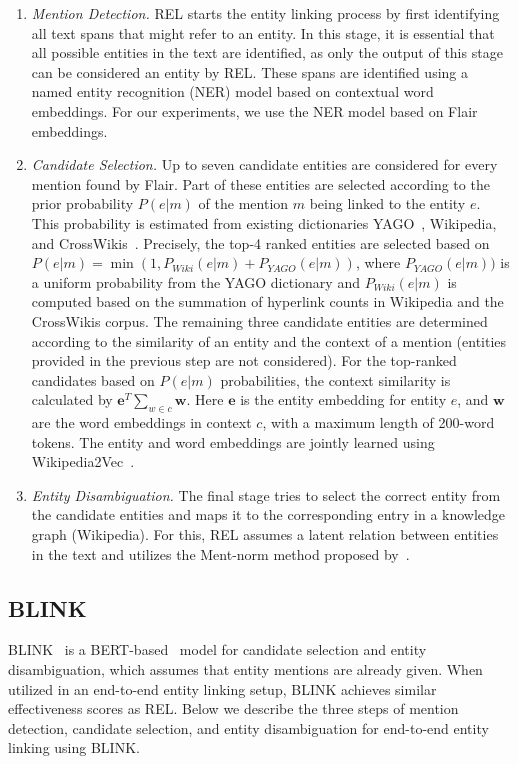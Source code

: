 \begin{enumerate}
	\item \emph{Mention Detection.} REL starts the entity linking process by first identifying all text spans that might refer to an entity. In this stage, it is essential that all possible entities in the text are identified, as only the output of this stage can be considered an entity by REL. These spans are identified using a named entity recognition (NER) model based on contextual word embeddings. For our experiments, we use the NER model based on Flair~\citep{flair} embeddings. 
	\item \emph{Candidate Selection.} Up to seven candidate entities are considered for every mention found by Flair. Part of these entities are selected according to the prior probability $P(e|m)$ of the mention $m$ being linked to the entity $e$. This probability is estimated from existing dictionaries YAGO~\citep{yago}, Wikipedia, and CrossWikis~\citep{crosswiki}. Precisely, the top-4 ranked entities are selected based on $P(e|m) = \min(1, P_{\mathit{Wiki}}(e|m) + P_{\mathit{YAGO}}(e|m))$, where $P_{\mathit{YAGO}}(e|m))$ is a uniform probability from the YAGO dictionary and $P_{\mathit{Wiki}}(e|m)$ is computed based on the summation of hyperlink counts in Wikipedia and the CrossWikis corpus.
	The remaining three candidate entities are determined according to the similarity of an entity and the context of a mention (entities provided in the previous step are not considered). For the top-ranked candidates based on $P(e|m)$ probabilities, the context similarity is calculated by $\mathbf{e}^T \sum_{w\in c}\mathbf{w}$. Here $\mathbf{e}$ is the entity embedding for entity $e$, and $\mathbf{w}$ are the word embeddings in context $c$, with a maximum length of 200-word tokens. The entity and word embeddings are jointly learned using Wikipedia2Vec~\citep{wikipedia2vec}. 
	\item \emph{Entity Disambiguation.} The final stage tries to select the correct entity from the candidate entities and maps it to the corresponding entry in a knowledge graph (Wikipedia). For this, REL assumes a latent relation between entities in the text and utilizes the Ment-norm method proposed by~\citet{ED-paper}.
\end{enumerate}

\subsection{BLINK}
BLINK~\citep{blink} is a BERT-based~\citep{BERT} model for candidate selection and entity disambiguation, which assumes that entity mentions are already given. When utilized in an end-to-end entity linking setup, BLINK achieves similar effectiveness scores as REL. Below we describe the three steps of mention detection, candidate selection, and entity disambiguation for end-to-end entity linking using BLINK.

